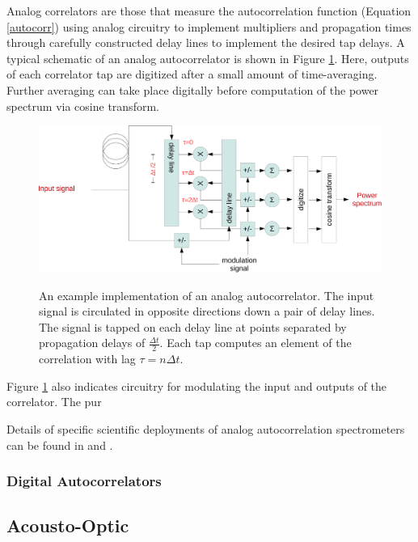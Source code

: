\documentclass{article}
\begin{document}
Analog correlators are those that measure the autocorrelation function (Equation \ref{autocorr}) using analog circuitry to implement multipliers and propagation times through carefully constructed delay lines to implement the desired tap delays.
A typical schematic of an analog autocorrelator is shown in Figure \ref{fig:analog-autocorr}. Here, outputs of each correlator tap are digitized after a small amount of time-averaging. Further averaging can take place digitally before computation of the power spectrum via cosine transform.

\begin{figure}
 \centering
 \includegraphics[width=\textwidth]{./figures/analog-autocorr-crop.pdf}
 \label{fig:analog-autocorr}
 \caption{An example implementation of an analog autocorrelator. The input signal is circulated in opposite directions down a pair of delay lines. The signal is tapped on each delay line at points separated by propagation delays of $\frac{\Delta t}{2}$. Each tap computes an element of the correlation with lag $\tau=n\Delta t$.}
\end{figure}

Figure \ref{fig:analog-autocorr} also indicates circuitry for modulating the input and outputs of the correlator. The pur

Details of specific scientific deployments of analog autocorrelation spectrometers can be found in \cite{Erickson2007} and \cite{Harris1998}.


\subsubsection{Digital Autocorrelators}\label{digital-autocorrelators}

\subsection{Acousto-Optic}\label{acousto-optic}
\end{document}
